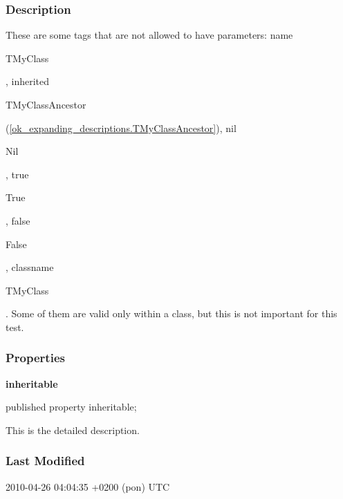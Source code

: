 \documentclass{report}
\newif\ifpdf
\begin{document}
\subsubsection*{\large{\textbf{Description}}\normalsize\hspace{1ex}\hfill}
These are some tags that are not allowed to have parameters: name \begin{ttfamily}TMyClass\end{ttfamily}, inherited \begin{ttfamily}TMyClassAncestor\end{ttfamily}(\ref{ok_expanding_descriptions.TMyClassAncestor}), nil \begin{ttfamily}Nil\end{ttfamily}, true \begin{ttfamily}True\end{ttfamily}, false \begin{ttfamily}False\end{ttfamily}, classname \begin{ttfamily}TMyClass\end{ttfamily}. Some of them are valid only within a class, but this is not important for this test.

\subsubsection*{\large{\textbf{Properties}}\normalsize\hspace{1ex}\hfill}
\begin{list}{}{
\setlength{\itemindent}{0cm}
\setlength{\listparindent}{0cm}
\setlength{\leftmargin}{\evensidemargin}
\addtolength{\leftmargin}{\tmplength}
\settowidth{\labelsep}{X}
\addtolength{\leftmargin}{\labelsep}
\setlength{\labelwidth}{\tmplength}
}
\label{ok_expanding_descriptions.TMyClass-inheritable}
\item[\textbf{inheritable}\hfill]
\ifpdf
\begin{flushleft}
\fi
\begin{ttfamily}
published property inheritable;\end{ttfamily}

\ifpdf
\end{flushleft}
\fi


\par This is the detailed description.\end{list}
\subsubsection*{\large{\textbf{Last Modified}}\normalsize\hspace{1ex}\hfill}
\par
2010-04-26 04:04:35 +0200 (pon) UTC
\end{document}
